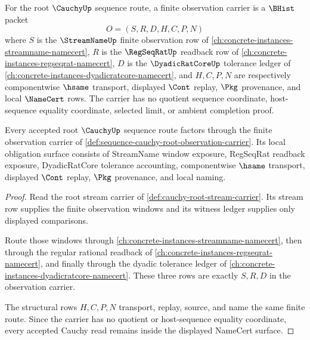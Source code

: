 \begin{definition}
\label{def:sequence-cauchy-root-observation-carrier}
For the root $\CauchyUp$ sequence route, a finite observation carrier is a $\BHist$ packet
$$
O=(S,R,D,H,C,P,N)
$$
where $S$ is the $\StreamNameUp$ finite observation row of \autoref{ch:concrete-instances-streamname-namecert}, $R$ is the $\RegSeqRatUp$ readback row of \autoref{ch:concrete-instances-regseqrat-namecert}, $D$ is the $\DyadicRatCoreUp$ tolerance ledger of \autoref{ch:concrete-instances-dyadicratcore-namecert}, and $H,C,P,N$ are respectively componentwise $\hsame$ transport, displayed $\Cont$ replay, $\Pkg$ provenance, and local $\NameCert$ rows. The carrier has no quotient sequence coordinate, host-sequence equality coordinate, selected limit, or ambient completion proof.
\end{definition}

\begin{theorem}
\label{thm:sequence-cauchy-root-stream-obligation}
Every accepted root $\CauchyUp$ sequence route factors through the finite observation carrier of \autoref{def:sequence-cauchy-root-observation-carrier}. Its local obligation surface consists of StreamName window exposure, RegSeqRat readback exposure, DyadicRatCore tolerance accounting, componentwise $\hsame$ transport, displayed $\Cont$ replay, $\Pkg$ provenance, and local naming.
\end{theorem}
\begin{proof}
Read the root stream carrier of \autoref{def:cauchy-root-stream-carrier}. Its stream row supplies the finite observation windows and its witness ledger supplies only displayed comparisons.

Route those windows through \autoref{ch:concrete-instances-streamname-namecert}, then through the regular rational readback of \autoref{ch:concrete-instances-regseqrat-namecert}, and finally through the dyadic tolerance ledger of \autoref{ch:concrete-instances-dyadicratcore-namecert}. These three rows are exactly $S,R,D$ in the observation carrier.

The structural rows $H,C,P,N$ transport, replay, source, and name the same finite route. Since the carrier has no quotient or host-sequence equality coordinate, every accepted Cauchy read remains inside the displayed NameCert surface.
\end{proof}

